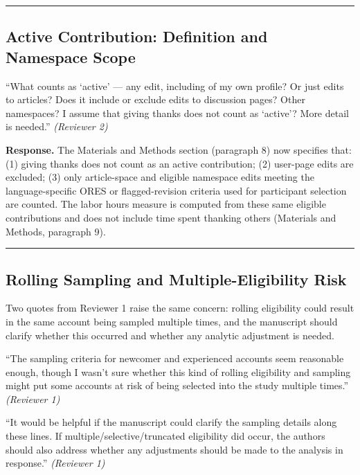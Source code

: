 \documentclass[12pt]{article}
\newenvironment{reviewquote}{%
  \def\FrameCommand{{\color{quotebarcolor}\vrule width 2pt}\colorbox{quotebg}}%
  \MakeFramed{\advance\hsize-\width \FrameRestore}%
  \small
}{%
  \endMakeFramed
}
\newcommand{\sectionnote}[1]{\par\smallskip#1\par\medskip}
\begin{document}
\bigskip\hrule\bigskip

\subsection{Active Contribution: Definition and Namespace Scope}

\begin{reviewquote}
``What counts as `active' --- any edit, including of my own profile? Or just edits to articles? Does it include or exclude edits to discussion pages? Other namespaces? I assume that giving thanks does not count as `active'? More detail is needed.'' \textit{(Reviewer 2)}
\end{reviewquote}

\textbf{Response.} The Materials and Methods section (paragraph 8) now specifies that: (1) giving thanks does not count as an active contribution; (2) user-page edits are excluded; (3) only article-space and eligible namespace edits meeting the language-specific ORES or flagged-revision criteria used for participant selection are counted. The labor hours measure is computed from these same eligible contributions and does not include time spent thanking others (Materials and Methods, paragraph 9).

\bigskip\hrule\bigskip

\subsection{Rolling Sampling and Multiple-Eligibility Risk}

\sectionnote{Two quotes from Reviewer 1 raise the same concern: rolling eligibility could result in the same account being sampled multiple times, and the manuscript should clarify whether this occurred and whether any analytic adjustment is needed.}

\begin{reviewquote}
``The sampling criteria for newcomer and experienced accounts seem reasonable enough, though I wasn't sure whether this kind of rolling eligibility and sampling might put some accounts at risk of being selected into the study multiple times.'' \textit{(Reviewer 1)}
\end{reviewquote}

\begin{reviewquote}
``It would be helpful if the manuscript could clarify the sampling details along these lines. If multiple/selective/truncated eligibility did occur, the authors should also address whether any adjustments should be made to the analysis in response.'' \textit{(Reviewer 1)}
\end{reviewquote}
\end{document}
